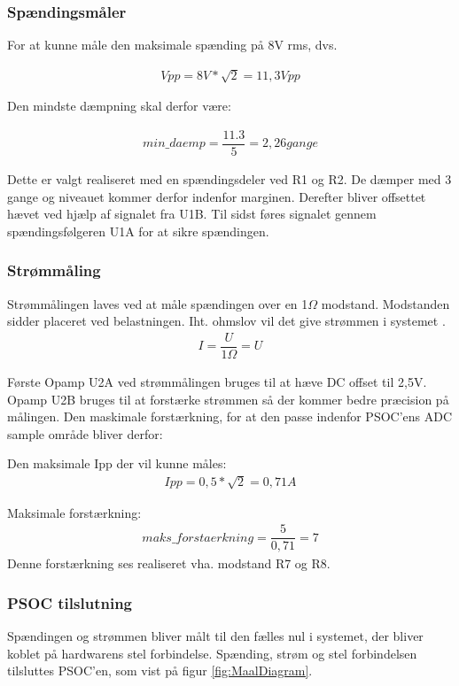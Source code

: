 \subsubsection{Spændingsmåler}
For at kunne måle den maksimale spænding på 8V rms, dvs.

\begin{align}
Vpp = 8V*\sqrt{2} = 11,3Vpp
\end{align}

Den mindste dæmpning skal derfor være:

\begin{align}
min\_daemp = \dfrac{11.3}{5} = 2,26 gange
\end{align}

Dette er valgt realiseret med en spændingsdeler ved R1 og R2. De dæmper med 3 gange og niveauet kommer derfor indenfor marginen.
Derefter bliver offsettet hævet ved hjælp af signalet fra U1B. Til sidst føres signalet gennem spændingsfølgeren U1A for at sikre spændingen.

\subsubsection{Strømmåling}
Strømmålingen laves ved at måle spændingen over en 1$\Omega$ modstand. Modstanden sidder placeret ved belastningen. Iht. ohmslov vil det give strømmen i systemet
.
\begin{align}
	I = \dfrac{U}{1\Omega} = U
\end{align}

Første Opamp U2A ved strømmålingen bruges til at hæve DC offset til 2,5V. Opamp U2B bruges til at forstærke strømmen så der kommer bedre præcision på målingen. Den maskimale forstærkning, for at den passe indenfor PSOC'ens ADC sample område bliver derfor:

Den maksimale Ipp der vil kunne måles:
\begin{align}
Ipp = 0,5*\sqrt{2} = 0,71A
\end{align}

Maksimale forstærkning:
\begin{align}
maks\_forstaerkning = \dfrac{5}{0,71} = 7
\end{align}
Denne forstærkning ses realiseret vha. modstand R7 og R8.  

\subsubsection{PSOC tilslutning}
Spændingen og strømmen bliver målt til den fælles nul i systemet, der bliver koblet på hardwarens stel forbindelse. Spænding, strøm og stel forbindelsen tilsluttes PSOC'en, som vist på figur \ref{fig:MaalDiagram}.




